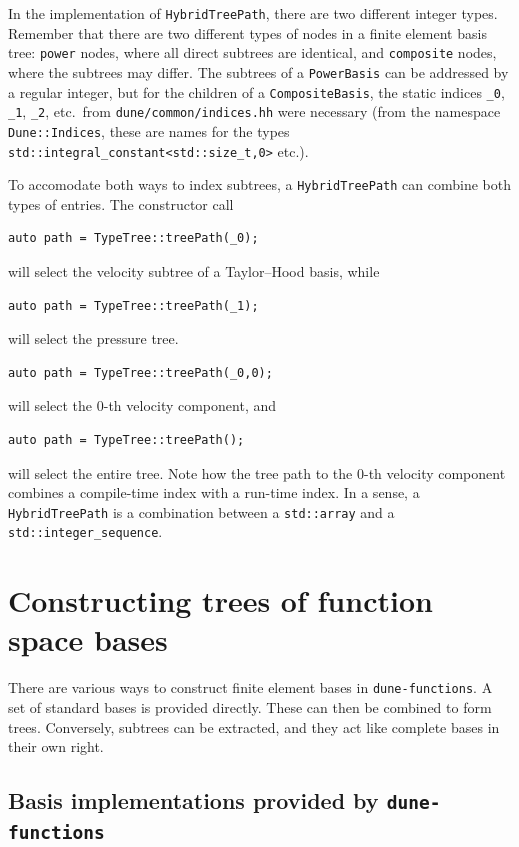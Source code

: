 \documentclass[a4paper,10pt,headings=normal,bibliography=totoc]{scrartcl}
\newcommand{\cpp}[1]{\lstinline[basicstyle=\ttfamily]!#1!}
\newcommand{\dunemodule}[1]{\texttt{#1}}
\newcommand{\file}[1]{\texttt{#1}}
\begin{document}
In the implementation of \cpp{HybridTreePath}, there are two different integer types.  Remember that there are
two different types of nodes in a finite element basis tree: \cpp{power} nodes, where all direct subtrees
are identical, and \cpp{composite} nodes, where the subtrees may differ.
The subtrees of a \cpp{PowerBasis} can be addressed by a regular integer,
but for the children of a \cpp{CompositeBasis}, the static indices \cpp{_0}, \cpp{_1}, \cpp{_2}, etc.\
from \file{dune/common/indices.hh} were necessary (from the namespace \cpp{Dune::Indices}, these are names
for the types \cpp{std::integral_constant<std::size_t,0>} etc.).

To accomodate both ways to index subtrees, a \cpp{HybridTreePath} can combine both types of entries.
The constructor call
\begin{lstlisting}
auto path = TypeTree::treePath(_0);
\end{lstlisting}
will select the velocity subtree of a Taylor--Hood basis, while
\begin{lstlisting}
auto path = TypeTree::treePath(_1);
\end{lstlisting}
will select the pressure tree.
\begin{lstlisting}
auto path = TypeTree::treePath(_0,0);
\end{lstlisting}
will select the $0$-th velocity component, and
\begin{lstlisting}
auto path = TypeTree::treePath();
\end{lstlisting}
will select the entire tree.  Note how the tree path to the $0$-th velocity component combines a compile-time
index with a run-time index.  In a sense, a \cpp{HybridTreePath} is a combination between a \cpp{std::array}
and a \cpp{std::integer_sequence}.







\section{Constructing trees of function space bases}

There are various ways to construct finite element bases in \dunemodule{dune-functions}.
A set of standard bases is provided directly.  These can then be combined to form trees.
Conversely, subtrees can be extracted, and they act like complete bases in their own right.

\subsection{Basis implementations provided by \texorpdfstring{\dunemodule{dune-functions}}{dune-functions}}
\label{subsec:available_bases}
\end{document}
